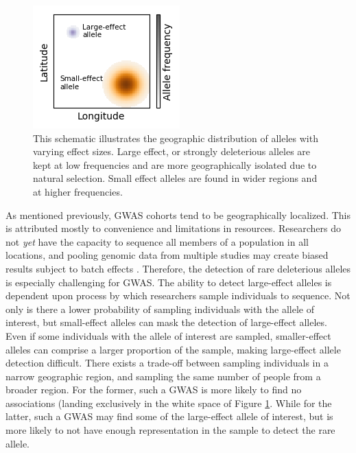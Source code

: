 \begin{figure}[H]
    \centering
\includegraphics[scale=1.5]{img/spatial_distributions.png}
    \caption{This schematic illustrates the geographic distribution of alleles with varying effect sizes. Large effect, or strongly deleterious alleles are kept at low frequencies and are more geographically isolated due to natural selection. Small effect alleles are found in wider regions and at higher frequencies.}
    \label{fig:spatial_schematic}
\end{figure}


As mentioned previously, GWAS cohorts tend to be geographically localized. This is attributed mostly to convenience and limitations in resources. Researchers do not \textit{yet} have the capacity to sequence all members of a population in all locations, and pooling genomic data from multiple studies may create biased results subject to batch effects \cite{woolston_potential_2015}\cite{gilad_reanalysis_2015}. Therefore, the detection of rare deleterious alleles is especially challenging for GWAS. The ability to detect large-effect alleles is dependent upon process by which researchers sample individuals to sequence. Not only is there a lower probability of sampling individuals with the allele of interest, but small-effect alleles can mask the detection of large-effect alleles. Even if some individuals with the allele of interest are sampled, smaller-effect alleles can comprise a larger proportion of the sample, making large-effect allele detection difficult. There exists a trade-off between sampling individuals in a narrow geographic region, and sampling the same number of people from a broader region. For the former, such a GWAS is more likely to find no associations (landing exclusively in the white space of Figure \ref{fig:spatial_schematic}. While for the latter, such a GWAS may find some of the large-effect allele of interest, but is more likely to not have enough representation in the sample to detect the rare allele. 


